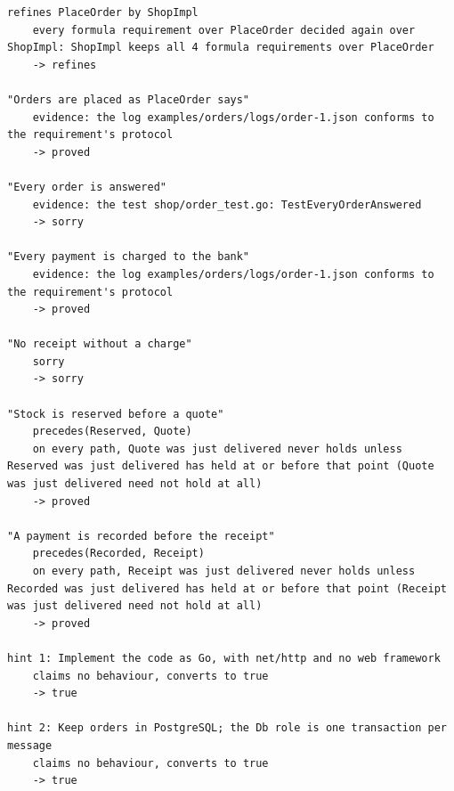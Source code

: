 \begin{lstlisting}[language={},basicstyle=\ttfamily\footnotesize,breaklines=true]
refines PlaceOrder by ShopImpl
    every formula requirement over PlaceOrder decided again over ShopImpl: ShopImpl keeps all 4 formula requirements over PlaceOrder
    -> refines

"Orders are placed as PlaceOrder says"
    evidence: the log examples/orders/logs/order-1.json conforms to the requirement's protocol
    -> proved

"Every order is answered"
    evidence: the test shop/order_test.go: TestEveryOrderAnswered
    -> sorry

"Every payment is charged to the bank"
    evidence: the log examples/orders/logs/order-1.json conforms to the requirement's protocol
    -> proved

"No receipt without a charge"
    sorry
    -> sorry

"Stock is reserved before a quote"
    precedes(Reserved, Quote)
    on every path, Quote was just delivered never holds unless Reserved was just delivered has held at or before that point (Quote was just delivered need not hold at all)
    -> proved

"A payment is recorded before the receipt"
    precedes(Recorded, Receipt)
    on every path, Receipt was just delivered never holds unless Recorded was just delivered has held at or before that point (Receipt was just delivered need not hold at all)
    -> proved

hint 1: Implement the code as Go, with net/http and no web framework
    claims no behaviour, converts to true
    -> true

hint 2: Keep orders in PostgreSQL; the Db role is one transaction per message
    claims no behaviour, converts to true
    -> true
\end{lstlisting}
